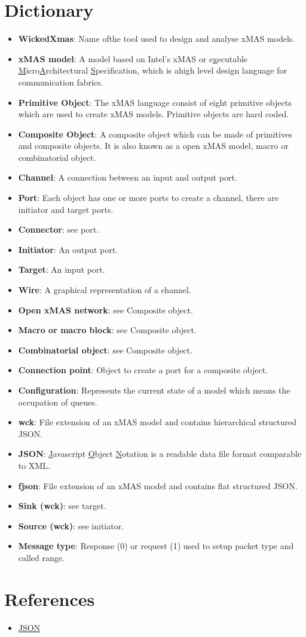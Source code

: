 \documentclass[a4paper,11pt,final]{article}
\begin{document}
\newpage
\section{Dictionary}
\begin{itemize}
	\item \textbf{WickedXmas}: Name ofthe tool used to design and analyse xMAS models.
	\item \textbf{xMAS model}:
	A model based on Intel's xMAS or e\underline{x}ecutable \underline{M}icro\underline{A}rchitectural \underline{S}pecification,
	which is ahigh level design language for communication fabrics.
	\item \textbf{Primitive Object}: The xMAS language consist of eight primitive objects which are used to create xMAS models.
	Primitive objects are hard coded.
	\item \textbf{Composite Object}: A composite object which can be made of primitives and composite objects.
	It is also known as a open xMAS model, macro or combinatorial object.
	\item \textbf{Channel}: A connection between an input and output port.
	\item \textbf{Port}: Each object has one or more ports to create a channel, there are initiator and target ports.
	\item \textbf{Connector}: see port.
	\item \textbf{Initiator}: An output port.
	\item \textbf{Target}: An input port.
	\item \textbf{Wire}: A graphical representation of a channel.
	\item \textbf{Open xMAS network}: see Composite object.
	\item \textbf{Macro or macro block}: see Composite object.
	\item \textbf{Combinatorial object}: see Composite object.
	\item \textbf{Connection point}: Object to create a port for a composite object.
	\item \textbf{Configuration}: Represents the current state of a model which means the occupation of queues.
	\item \textbf{wck}: File extension of an xMAS model and contains hierarchical structured JSON.
	\item \textbf{JSON}: \underline{J}avascript \underline{O}bject \underline{N}otation is a readable data file format comparable to XML.
	\item \textbf{fjson}: File extension of an xMAS model and contains flat structured JSON.
	\item \textbf{Sink (wck)}: see target. 
	\item \textbf{Source (wck)}: see initiator.
	\item \textbf{Message type}: Response (0) or request (1) used to setup packet type and called range.
\end{itemize}


\newpage
\section{References}
\begin{itemize}
	\item \href{http://www.json.org/}{JSON}
\end{itemize}
\end{document}
